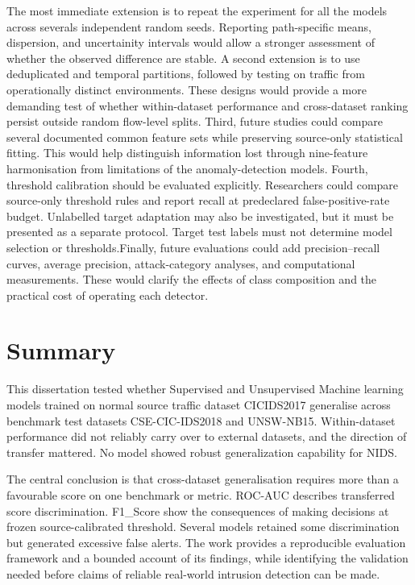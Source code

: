 The most immediate extension is to repeat the experiment for all the models across severals independent random seeds. Reporting path-specific 
means, dispersion, and uncertainity intervals would allow a stronger assessment of whether the observed difference are stable. A second extension 
is to use deduplicated and temporal partitions, followed by testing on traffic from operationally distinct environments. These designs would 
provide a more demanding test of whether within-dataset performance and cross-dataset ranking persist outside random flow-level splits.
Third, future studies could compare several documented common feature sets while preserving source-only statistical fitting. This would help 
distinguish information lost through nine-feature harmonisation from limitations of the anomaly-detection models. Fourth, threshold calibration 
should be evaluated explicitly. Researchers could compare source-only threshold rules and report recall at predeclared false-positive-rate budget. 
Unlabelled target adaptation may also be investigated, but it must be presented as a separate protocol. Target test labels must not determine 
model selection or thresholds.Finally, future evaluations could add precision--recall curves, average precision, attack-category analyses, and 
computational measurements. These would clarify the effects of class composition and the practical cost of operating each detector.


\section{Summary}
\label{sec:conclusion-summary}

This dissertation tested whether Supervised and Unsupervised Machine learning models trained on normal source traffic dataset CICIDS2017 generalise 
across benchmark test datasets CSE-CIC-IDS2018 and UNSW-NB15. Within-dataset performance did not reliably carry over to external datasets, and the 
direction of transfer mattered. No model showed robust generalization capability for NIDS.

The central conclusion is that cross-dataset generalisation requires more than a favourable score on one benchmark or metric. 
ROC-AUC describes transferred score discrimination. F1\_Score show the consequences of making decisions at frozen source-calibrated threshold. 
Several models retained some discrimination but generated excessive false alerts. The work provides a reproducible evaluation framework and a 
bounded account of its findings, while identifying the validation needed before claims of reliable real-world intrusion detection can be made.
